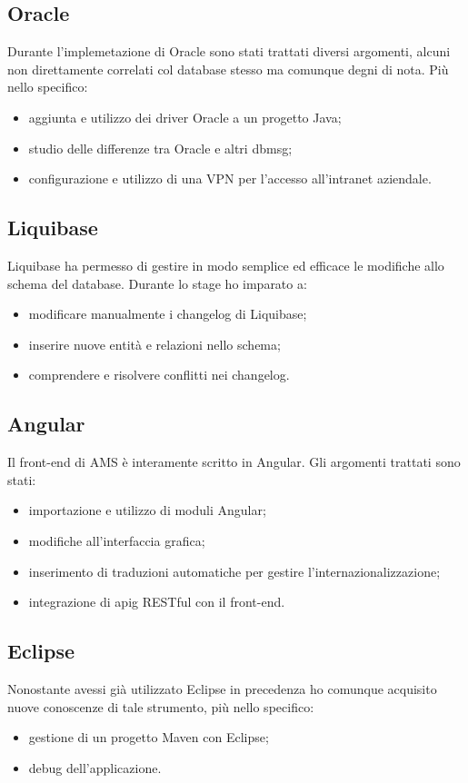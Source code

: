 \subsection{Oracle}
Durante l'implemetazione di Oracle sono stati trattati diversi argomenti, alcuni non direttamente correlati col database stesso ma comunque degni di nota. Più nello specifico:
\begin{itemize}
    \item aggiunta e utilizzo dei driver Oracle a un progetto Java;
    \item studio delle differenze tra Oracle e altri \gls{dbmsg};
    \item configurazione e utilizzo di una VPN per l'accesso all'intranet aziendale.
\end{itemize}

\subsection{Liquibase}
Liquibase ha permesso di gestire in modo semplice ed efficace le modifiche allo schema del database. Durante lo stage ho imparato a:
\begin{itemize}
    \item modificare manualmente i changelog di Liquibase;
    \item inserire nuove entità e relazioni nello schema;
    \item comprendere e risolvere conflitti nei changelog.
\end{itemize}

\subsection{Angular}
Il front-end di AMS è interamente scritto in Angular. Gli argomenti trattati sono stati:
\begin{itemize}
    \item importazione e utilizzo di moduli Angular;
    \item modifiche all'interfaccia grafica;
    \item inserimento di traduzioni automatiche per gestire l'internazionalizzazione;
    \item integrazione di \gls{apig} RESTful con il front-end.
\end{itemize}

\subsection{Eclipse}
Nonostante avessi già utilizzato Eclipse in precedenza ho comunque acquisito nuove conoscenze di tale strumento, più nello specifico:
\begin{itemize}
    \item gestione di un progetto Maven con Eclipse;
    \item debug dell'applicazione.
\end{itemize}

